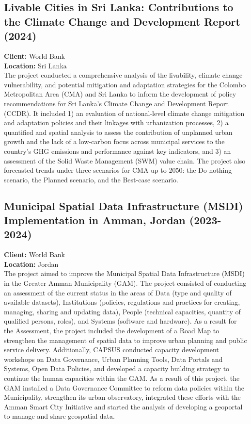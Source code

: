 \documentclass[
	a4paper,
	12pt,
	unnumberedsections,
]{CSSullivanBusinessReport}
\begin{document}
\subsection{Livable Cities in Sri Lanka: Contributions to the Climate Change and Development Report  (2024)}
\textbf{Client:}  World Bank \\
\textbf{Location:}  Sri Lanka \\[0.5em]
 The project conducted a comprehensive analysis of the livability, climate change vulnerability, and potential mitigation and adaptation strategies for the Colombo Metropolitan Area (CMA) and Sri Lanka to inform the development of policy recommendations for Sri Lanka's Climate Change and Development Report (CCDR). It included 1) an evaluation of national-level climate change mitigation and adaptation policies and their linkages with urbanization processes, 2) a quantified and spatial analysis to assess the contribution of unplanned urban growth and the lack of a low-carbon focus across municipal services to the country’s GHG emissions and performance against key indicators, and 3) an assessment of the Solid Waste Management (SWM) value chain. The project also forecasted trends under three scenarios for CMA up to 2050: the Do-nothing scenario, the Planned scenario, and the Best-case scenario.

\subsection{Municipal Spatial Data Infrastructure (MSDI) Implementation in Amman, Jordan (2023-2024)}
\textbf{Client:}  World Bank \\
\textbf{Location:}  Jordan \\[0.5em]
 The project aimed to improve the Municipal Spatial Data Infrastructure (MSDI) in the Greater Amman Municipality (GAM). The project consisted of conducting an assessment of the current status in the areas of Data (type and quality of available datasets), Institutions (policies, regulations and practices for creating, managing, sharing and updating data), People (technical capacities, quantity of qualified persons, roles), and Systems (software and hardware). As a result for the Assessment, the project included the development of a Road Map to strengthen the management of spatial data to improve urban planning and public service delivery. Additionally, CAPSUS conducted capacity development workshops on Data Governance, Urban Planning Tools, Data Portals and Systems, Open Data Policies, and developed a capacity building strategy to continue the human capacities within the GAM.  As a result of this project, the GAM installed a Data Governance Committee to reform data policies within the Municipality, strengthen its urban observatory, integrated these efforts with the Amman Smart City Initiative and started the analysis of developing a geoportal to manage and share geospatial data.
\end{document}
